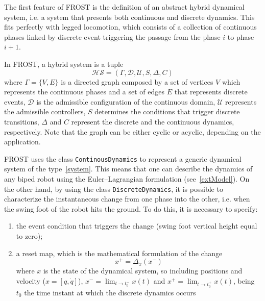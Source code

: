 \documentclass[11pt]{article}
\begin{document}
The first feature of FROST is the definition of an abstract hybrid dynamical system, i.e. a system that presents both continuous and discrete dynamics. This fits perfectly with legged locomotion, which consists of a collection of continuous phases linked by discrete event triggering the passage from the phase $i$ to phase $i+1$.

In FROST, a hybrid system is a tuple
\begin{equation}
    \mathscr{HS} = (\Gamma, \mathcal{D}, \mathcal{U}, S, \Delta, C)
    \label{tupleHS}
\end{equation}
where $\Gamma = \{V,E\}$ is a directed graph composed by a set of vertices $V$ which represents the continuous phases and a set of edges $E$ that represents discrete events, $\mathcal{D}$ is the admissible configuration of the continuous domain, $\mathcal{U}$ represents the admissible controllers, $S$ determines the conditions that trigger discrete transitions, $\Delta$ and $C$ represent the discrete and the continuous dynamics, respectively. Note that the graph can be either cyclic or acyclic, depending on the application.

FROST uses the class \verb!ContinousDynamics! to represent a generic dynamical system of the type~\eqref{system}. This means that one can describe the dynamics of any biped robot using the Euler--Lagrangian formulation (see~\eqref{extModel}). On the other hand, by using the class \verb!DiscreteDynamics!, it is possible to characterize the instantaneous change from one phase into the other, i.e. when the swing foot of the robot hits the ground. To do this, it is necessary to specify:
\begin{enumerate}
    \item the event condition that triggers the change (swing foot vertical height equal to zero);
    \item a reset map, which is the mathematical formulation of the change
    \begin{equation}
        x^+ = \Delta_x(x^-)
    \end{equation}
    where $x$ is the state of the dynamical system, so including positions and velocity ($x = [q, \dot{q}]$), $x^- = \lim_{t\rightarrow{t_0^-}}x(t)$ and $x^+ = \lim_{t\rightarrow{t_0^+}}x(t)$, being $t_0$ the time instant at which the discrete dynamics occurs
\end{enumerate}
\end{document}
